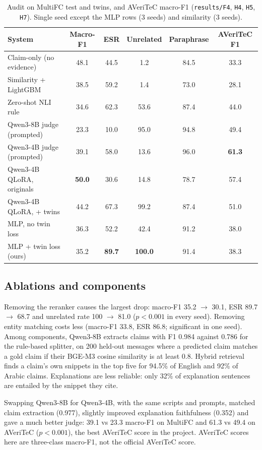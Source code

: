 \begin{table}[t]
\centering\small
\caption{Audit on MultiFC test and twins, and AVeriTeC macro-F1 (\texttt{results/F4}, \texttt{H4}, \texttt{H5}, \texttt{H7}). Single seed except the MLP rows (3 seeds) and similarity (3 seeds).}
\label{tab:audit}
\begin{tabular}{@{}lccccc@{}}
\toprule
System & Macro-F1 & ESR & Unrelated & Paraphrase & AVeriTeC F1 \\
\midrule
Claim-only (no evidence) & 48.1 & 44.5 & 1.2 & 84.5 & 33.3 \\
Similarity + LightGBM & 38.5 & 59.2 & 1.4 & 73.0 & 28.1 \\
Zero-shot NLI rule & 34.6 & 62.3 & 53.6 & 87.4 & 44.0 \\
Qwen3-8B judge (prompted) & 23.3 & 10.0 & 95.0 & 94.8 & 49.4 \\
Qwen3-4B judge (prompted) & 39.1 & 58.0 & 13.6 & 96.0 & \textbf{61.3} \\
Qwen3-4B QLoRA, originals & \textbf{50.0} & 30.6 & 14.8 & 78.7 & 57.4 \\
Qwen3-4B QLoRA, + twins & 44.2 & 67.3 & 99.2 & 87.4 & 51.0 \\
MLP, no twin loss & 36.3 & 52.2 & 42.4 & 91.2 & 38.0 \\
MLP + twin loss (ours) & 35.2 & \textbf{89.7} & \textbf{100.0} & 91.4 & 38.3 \\
\bottomrule
\end{tabular}
\end{table}

\subsection{Ablations and components}
Removing the reranker causes the largest drop: macro-F1 35.2 $\rightarrow$ 30.1, ESR 89.7 $\rightarrow$ 68.7 and unrelated rate 100 $\rightarrow$ 81.0 ($p<0.001$ in every seed). Removing entity matching costs less (macro-F1 33.8, ESR 86.8; significant in one seed). Among components, Qwen3-8B extracts claims with F1 0.984 against 0.786 for the rule-based splitter, on 200 held-out messages where a predicted claim matches a gold claim if their BGE-M3 cosine similarity is at least 0.8. Hybrid retrieval finds a claim's own snippets in the top five for 94.5\% of English and 92\% of Arabic claims. Explanations are less reliable: only 32\% of explanation sentences are entailed by the snippet they cite.

Swapping Qwen3-8B for Qwen3-4B, with the same scripts and prompts, matched claim extraction (0.977), slightly improved explanation faithfulness (0.352) and gave a much better judge: 39.1 vs 23.3 macro-F1 on MultiFC and 61.3 vs 49.4 on AVeriTeC ($p<0.001$), the best AVeriTeC score in the project. AVeriTeC scores here are three-class macro-F1, not the official AVeriTeC score.

